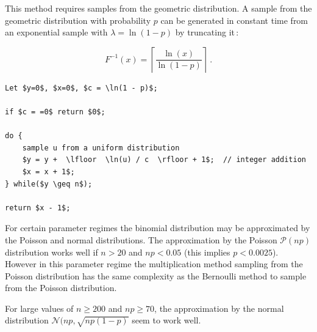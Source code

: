 \documentclass[a4paper]{scrartcl}
\begin{document}
This method requires samples from the geometric distribution.  A sample from the geometric distribution with probability $p$ can be generated in constant time from an exponential sample with $\lambda = \ln(1-p)$ by truncating it\,\citep{Devroye1986}:

\begin{equation*}
F^{-1} (x) = \left\lceil \frac{\ln(x)}{\ln(1-p)} \right\rceil~. 
\end{equation*}

\vspace{3mm}
{
\begin{lstlisting}[caption={Geometric method to sample from a binomial distribution by \citet{Devroye1980}.}, label=alg:geometric_method]
Let $y=0$, $x=0$, $c = \ln(1 - p)$;

if $c = =0$ return $0$;

do {
    sample u from a uniform distribution
    $y = y +  \lfloor  \ln(u) / c  \rfloor + 1$;  // integer addition
    $x = x + 1$;
} while($y \geq n$);

return $x - 1$;
\end{lstlisting}
}

For certain parameter regimes the binomial distribution may be approximated by the Poisson and normal distributions. The approximation by the Poisson $\mathcal{P}(np)$ distribution works well if $n > 20$ and $np < 0.05$ (this implies $p < 0.0025$). However in this parameter regime the multiplication method sampling from the Poisson distribution has the same complexity as the Bernoulli method to sample from the Poisson distribution.

For large values of $n \geq 200$ and $np \geq 70$, the approximation by the normal distribution $\mathcal{N}(np, \sqrt{np(1 - p)}$ seem to work well.
\end{document}
